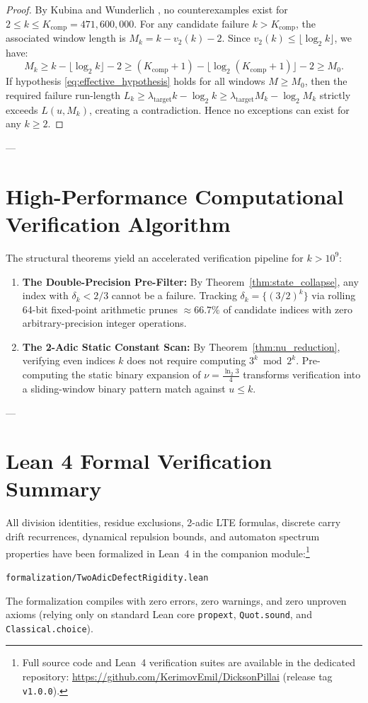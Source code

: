 \documentclass[11pt,reqno]{amsart}
\theoremstyle{definition}
\numberwithin{equation}{section}
\begin{document}
\begin{proof}
By Kubina and Wunderlich \cite{kubina1990}, no counterexamples exist for $2 \le k \le K_{\mathrm{comp}} = 471{,}600{,}000$.
For any candidate failure $k > K_{\mathrm{comp}}$, the associated window length is $M_k = k - v_2(k) - 2$. Since $v_2(k) \le \lfloor \log_2 k \rfloor$, we have:
\[
M_k \ge k - \lfloor \log_2 k \rfloor - 2 \ge (K_{\mathrm{comp}} + 1) - \lfloor \log_2(K_{\mathrm{comp}} + 1) \rfloor - 2 \ge M_0.
\]
If hypothesis \eqref{eq:effective_hypothesis} holds for all windows $M \ge M_0$, then the required failure run-length $L_k \ge \lambda_{\mathrm{target}} k - \log_2 k \ge \lambda_{\mathrm{target}} M_k - \log_2 M_k$ strictly exceeds $L(u, M_k)$, creating a contradiction. Hence no exceptions can exist for any $k \ge 2$.
\end{proof}

---

\section{High-Performance Computational Verification Algorithm}

The structural theorems yield an accelerated verification pipeline for $k > 10^9$:
\begin{enumerate}
    \item \textbf{The Double-Precision Pre-Filter:} By Theorem~\ref{thm:state_collapse}, any index with $\delta_k < 2/3$ cannot be a failure. Tracking $\delta_k = \{(3/2)^k\}$ via rolling 64-bit fixed-point arithmetic prunes $\approx 66.7\%$ of candidate indices with zero arbitrary-precision integer operations.
    \item \textbf{The 2-Adic Static Constant Scan:} By Theorem~\ref{thm:nu_reduction}, verifying even indices $k$ does not require computing $3^k \bmod 2^k$. Pre-computing the static binary expansion of $\nu = \frac{\ln_2 3}{4}$ transforms verification into a sliding-window binary pattern match against $u \le k$.
\end{enumerate}

---

\section{Lean 4 Formal Verification Summary}

All division identities, residue exclusions, 2-adic LTE formulas, discrete carry drift recurrences, dynamical repulsion bounds, and automaton spectrum properties have been formalized in Lean~4 in the companion module:\footnote{Full source code and Lean~4 verification suites are available in the dedicated repository: \url{https://github.com/KerimovEmil/DicksonPillai} (release tag \texttt{v1.0.0}).}
\begin{center}
\texttt{formalization/TwoAdicDefectRigidity.lean}
\end{center}
The formalization compiles with zero errors, zero warnings, and zero unproven axioms (relying only on standard Lean core \texttt{propext}, \texttt{Quot.sound}, and \texttt{Classical.choice}).
\end{document}
